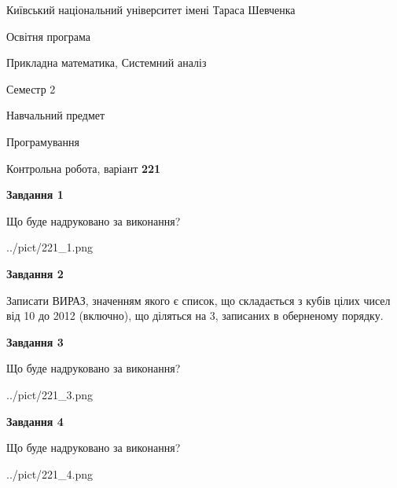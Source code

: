 \documentclass[12pt, ukrainian]{article}
\begin{document}
{{\begin {small}\par
{ \center  Київський національний університет імені Тараса Шевченка \par}
{\parbox {5 cm}{Освітня програма \hfill}{\parbox {8 cm}{Прикладна математика, Системний аналіз \hfill}}\parbox {5 cm}{\hfill Семестр 2}}\par
{\parbox {5 cm} {Навчальний предмет \hfill}\parbox {7 cm}{Програмування \hfill}\parbox {6cm}{\hfill}\par}\vspace{-7pt} \end{small}}{\center Контрольна робота, варіант  \No \textbf
{ 221 }\par}}
{
\begin {large}
{\begin {center}\textbf{Завдання 1}\end {center}}\par
Що буде надруковано за виконання?\par\par
\begin{center}
	{../pict/221_1.png}
\end{center}
\newpage

{\begin {center}\textbf{Завдання 2}\end {center}}\par

Записати ВИРАЗ, значенням якого є список, що складається з кубів цілих чисел від 10 до 2012 (включно), що діляться на 3, записаних в обернено\-му порядку.\par
\newpage

{\begin {center}\textbf{Завдання 3}\end {center}}\par
Що буде надруковано за виконання?\par
\begin{center}
	{../pict/221_3.png}
\end{center}
\newpage

{\begin {center}\textbf{Завдання 4}\end {center}}\par
Що буде надруковано за виконання?\par
\begin{center}
	{../pict/221_4.png}
\end{center}
\newpage


\end{large}}
\end{document}
